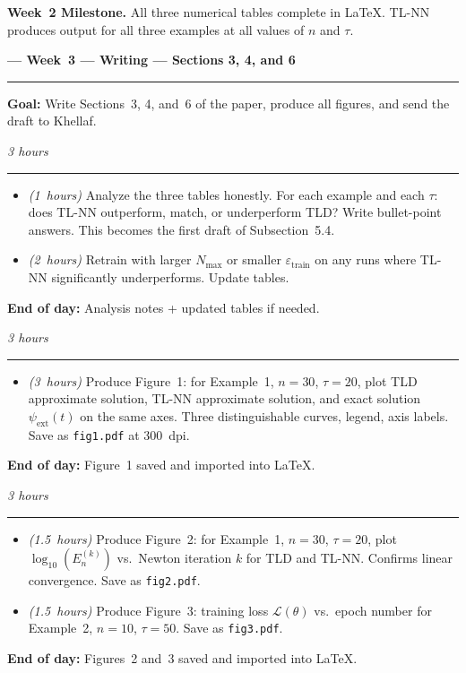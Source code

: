 \documentclass[12pt,a4paper]{article}
\newcommand{\hrs}[1]{\textit{\color{darkgray}(#1~hours)}}
\newcommand{\weekheading}[2]{%
  \vspace{0.8em}
  \noindent
  {\large\bfseries\color{midblue}--- Week~#1 ---
  \hfill\normalsize\normalfont\color{darkgray}#2}
  \vspace{0.2em}
  \\{\color{midblue}\rule{\linewidth}{0.6pt}}
  \vspace{0.3em}
}
\newcommand{\dayheading}[2]{%
  \vspace{0.3em}
  \noindent{\bfseries\color{darkblue}Day~#1}%
  \hfill{\small\color{darkgray}\textit{#2}}%
  \\[-0.4em]{\color{midgray}\rule{\linewidth}{0.4pt}}%
  \vspace{0.1em}
}
\begin{document}
\begin{tcolorbox}[milestonestyle]
\noindent\textbf{\color{darkred}Week~2 Milestone.}
All three numerical tables complete in \LaTeX.
TL-NN produces output for all three examples at all
values of $n$ and $\tau$.
\end{tcolorbox}

\weekheading{3}{Writing --- Sections 3, 4, and 6}

\noindent\textbf{Goal:}
Write Sections~3, 4, and~6 of the paper, produce all
figures, and send the draft to Khellaf.

\vspace{0.5em}

\begin{tcolorbox}[daystyle]
\dayheading{15}{3 hours}
\begin{itemize}[leftmargin=1.8em,itemsep=3pt]
  \item[\color{midblue}$\bullet$]
    \hrs{1} Analyze the three tables honestly. For each
    example and each $\tau$: does TL-NN outperform,
    match, or underperform TLD? Write bullet-point answers.
    This becomes the first draft of Subsection~5.4.
  \item[\color{midblue}$\bullet$]
    \hrs{2} Retrain with larger $N_{\max}$ or smaller
    $\varepsilon_{\mathrm{train}}$ on any runs where
    TL-NN significantly underperforms. Update tables.
\end{itemize}
\noindent\textbf{End of day:}
Analysis notes + updated tables if needed.
\end{tcolorbox}

\begin{tcolorbox}[daystyle]
\dayheading{16}{3 hours}
\begin{itemize}[leftmargin=1.8em,itemsep=3pt]
  \item[\color{midblue}$\bullet$]
    \hrs{3} Produce Figure~1: for Example~1, $n = 30$,
    $\tau = 20$, plot TLD approximate solution, TL-NN
    approximate solution, and exact solution
    $\psi_{\mathrm{ext}}(t)$ on the same axes.
    Three distinguishable curves, legend, axis labels.
    Save as \texttt{fig1.pdf} at 300~dpi.
\end{itemize}
\noindent\textbf{End of day:}
Figure~1 saved and imported into \LaTeX.
\end{tcolorbox}

\begin{tcolorbox}[daystyle]
\dayheading{17}{3 hours}
\begin{itemize}[leftmargin=1.8em,itemsep=3pt]
  \item[\color{midblue}$\bullet$]
    \hrs{1.5} Produce Figure~2: for Example~1, $n = 30$,
    $\tau = 20$, plot $\log_{10}(E_n^{(k)})$ vs.\
    Newton iteration $k$ for TLD and TL-NN.
    Confirms linear convergence. Save as \texttt{fig2.pdf}.
  \item[\color{midblue}$\bullet$]
    \hrs{1.5} Produce Figure~3: training loss
    $\mathcal{L}(\theta)$ vs.\ epoch number for Example~2,
    $n = 10$, $\tau = 50$. Save as \texttt{fig3.pdf}.
\end{itemize}
\noindent\textbf{End of day:}
Figures~2 and~3 saved and imported into \LaTeX.
\end{tcolorbox}
\end{document}
